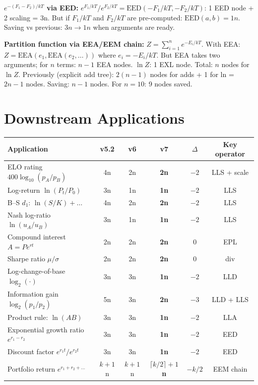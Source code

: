 \documentclass[11pt]{article}
\newcommand{\imp}[1]{\textcolor{imp}{\textbf{#1}}}
\begin{document}
\noindent \textbf{$e^{-(F_1-F_2)/kT}$ via EED:}
$e^{F_1/kT} / e^{F_2/kT} = \mathrm{EED}(-F_1/kT, -F_2/kT)$: 1 EED node + 2 scaling = 3n.
But if $F_1/kT$ and $F_2/kT$ are pre-computed: $\mathrm{EED}(a, b) = 1n$.
Saving vs previous: $3n \to 1n$ when arguments are ready.

\noindent \textbf{Partition function via EEA/EEM chain:}
$Z = \sum_{i=1}^n e^{-E_i/kT}$. With EEA:
$Z = \mathrm{EEA}(e_1, \mathrm{EEA}(e_2, \ldots))$ where $e_i = -E_i/kT$.
But EEA takes two arguments; for $n$ terms: $n-1$ EEA nodes.
$\ln Z$: 1 EXL node. Total: $n$ nodes for $\ln Z$.
Previously (explicit add tree): $2(n-1)$ nodes for adds + 1 for ln = $2n-1$ nodes.
Saving: $n-1$ nodes. For $n=10$: 9 nodes saved.

\section{Downstream Applications}
\label{sec:downstream}

\begin{center}
\begin{tabular}{lccccc}
\toprule
Application & v5.2 & v6 & v7 & $\Delta$ & Key operator \\
\midrule
ELO rating $400\log_{10}(p_A/p_B)$ & 4n & 2n & \imp{2n} & $-2$ & LLS + scale \\
Log-return $\ln(P_t/P_0)$           & 3n & 1n & \imp{1n} & $-2$ & LLS \\
B--S $d_1$: $\ln(S/K) + \ldots$    & 4n & 2n & \imp{2n} & $-2$ & LLS \\
Nash log-ratio $\ln(u_A/u_B)$       & 3n & 1n & \imp{1n} & $-2$ & LLS \\
Compound interest $A=Pe^{rt}$       & 2n & 2n & \imp{2n} & 0   & EPL \\
Sharpe ratio $\mu/\sigma$           & 2n & 2n & \imp{2n} & 0   & div \\
Log-change-of-base $\log_2(\cdot)$  & 3n & 3n & \imp{1n} & $-2$ & LLD \\
Information gain $\log_2(p_1/p_2)$  & 5n & 3n & \imp{2n} & $-3$ & LLD + LLS \\
Product rule: $\ln(AB)$             & 3n & 3n & \imp{1n} & $-2$ & LLA \\
Exponential growth ratio $e^{r_1-r_2}$ & 3n & 3n & \imp{1n} & $-2$ & EED \\
Discount factor $e^{r_1t}/e^{r_2t}$ & 3n & 3n & \imp{1n} & $-2$ & EED \\
Portfolio return $e^{r_1+r_2+\ldots}$ & $k+1$n & $k+1$n & \imp{$\lceil k/2 \rceil + 1$n} & $-k/2$ & EEM chain \\
\bottomrule
\end{tabular}
\end{center}
\end{document}
